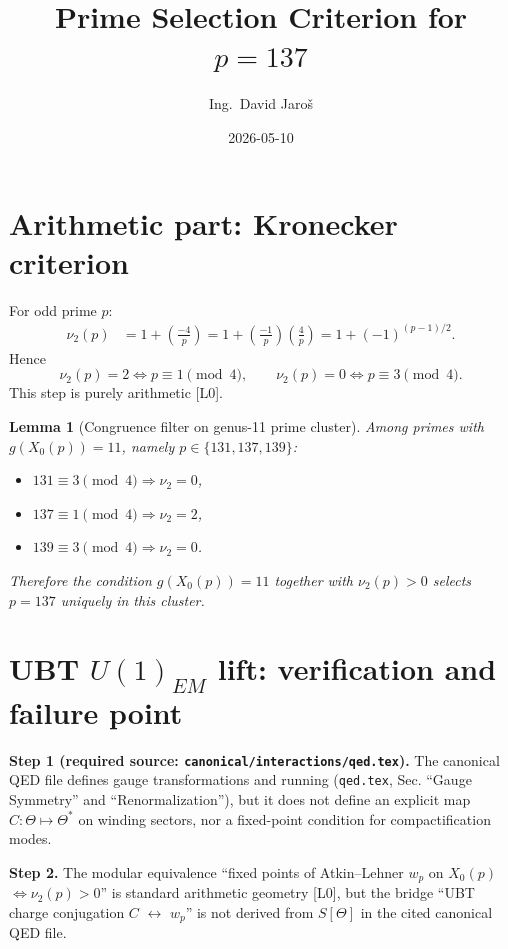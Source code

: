 \documentclass[12pt,a4paper]{article}
\title{Prime Selection Criterion for $p=137$}
\author{Ing.\ David Jaro\v{s}}
\date{2026-05-10}
\newtheorem{lemma}{Lemma}[section]
\begin{document}
  \maketitle
\fi

\section{Arithmetic part: Kronecker criterion}

For odd prime $p$:
\begin{align}
\nu_2(p)
&= 1 + \left(\frac{-4}{p}\right)
 = 1 + \left(\frac{-1}{p}\right)\left(\frac{4}{p}\right)
 = 1 + (-1)^{(p-1)/2}.
\end{align}
Hence
\begin{equation}
\nu_2(p)=2 \iff p\equiv 1\pmod 4,\qquad
\nu_2(p)=0 \iff p\equiv 3\pmod 4.
\end{equation}
This step is purely arithmetic [L0].

\begin{lemma}[Congruence filter on genus-11 prime cluster]
Among primes with $g(X_0(p))=11$, namely $p\in\{131,137,139\}$:
\begin{itemize}
  \item $131\equiv 3\pmod 4 \Rightarrow \nu_2=0$,
  \item $137\equiv 1\pmod 4 \Rightarrow \nu_2=2$,
  \item $139\equiv 3\pmod 4 \Rightarrow \nu_2=0$.
\end{itemize}
Therefore the condition $g(X_0(p))=11$ together with $\nu_2(p)>0$
selects $p=137$ uniquely in this cluster.
\end{lemma}

\section{UBT $U(1)_{EM}$ lift: verification and failure point}

\textbf{Step 1 (required source: \texttt{canonical/interactions/qed.tex}).}
The canonical QED file defines gauge transformations and running
(\texttt{qed.tex}, Sec. ``Gauge Symmetry'' and ``Renormalization''),
but it does not define an explicit map
$C: \Theta\mapsto \Theta^*$ on winding sectors, nor a fixed-point condition
for compactification modes.

\textbf{Step 2.} The modular equivalence
``fixed points of Atkin--Lehner $w_p$ on $X_0(p)$ $\Leftrightarrow \nu_2(p)>0$''
is standard arithmetic geometry [L0], but the bridge
``UBT charge conjugation $C$ $\leftrightarrow$ $w_p$'' is not derived from
$S[\Theta]$ in the cited canonical QED file.
\end{document}
